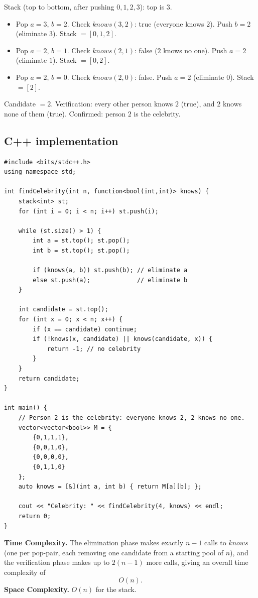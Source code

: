 Stack (top to bottom, after pushing $0,1,2,3$): top is $3$.

\begin{itemize}
  \item Pop $a=3$, $b=2$. Check $\textit{knows}(3,2)$: true (everyone
        knows $2$). Push $b=2$ (eliminate $3$). Stack $=[0,1,2]$.
  \item Pop $a=2$, $b=1$. Check $\textit{knows}(2,1)$: false ($2$ knows
        no one). Push $a=2$ (eliminate $1$). Stack $=[0,2]$.
  \item Pop $a=2$, $b=0$. Check $\textit{knows}(2,0)$: false. Push
        $a=2$ (eliminate $0$). Stack $=[2]$.
\end{itemize}

Candidate $=2$. Verification: every other person knows $2$ (true), and
$2$ knows none of them (true). Confirmed: person $2$ is the celebrity.

\subsection*{C++ implementation}

\begin{lstlisting}
#include <bits/stdc++.h>
using namespace std;

int findCelebrity(int n, function<bool(int,int)> knows) {
    stack<int> st;
    for (int i = 0; i < n; i++) st.push(i);

    while (st.size() > 1) {
        int a = st.top(); st.pop();
        int b = st.top(); st.pop();

        if (knows(a, b)) st.push(b); // eliminate a
        else st.push(a);             // eliminate b
    }

    int candidate = st.top();
    for (int x = 0; x < n; x++) {
        if (x == candidate) continue;
        if (!knows(x, candidate) || knows(candidate, x)) {
            return -1; // no celebrity
        }
    }
    return candidate;
}

int main() {
    // Person 2 is the celebrity: everyone knows 2, 2 knows no one.
    vector<vector<bool>> M = {
        {0,1,1,1},
        {0,0,1,0},
        {0,0,0,0},
        {0,1,1,0}
    };
    auto knows = [&](int a, int b) { return M[a][b]; };

    cout << "Celebrity: " << findCelebrity(4, knows) << endl;
    return 0;
}
\end{lstlisting}

\begin{complexitybox}
\textbf{Time Complexity.} The elimination phase makes exactly $n-1$
calls to $\textit{knows}$ (one per pop-pair, each removing one candidate
from a starting pool of $n$), and the verification phase makes up to
$2(n-1)$ more calls, giving an overall time complexity of
\[
  O(n).
\]
\textbf{Space Complexity.} $O(n)$ for the stack.
\end{complexitybox}

